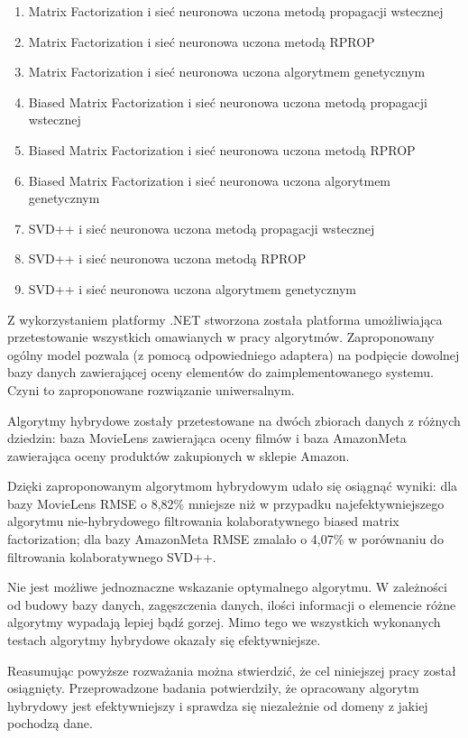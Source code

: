 \documentclass[twoside]{iisthesis}
\begin{document}
	\begin{enumerate}
		\item Matrix Factorization i sieć neuronowa uczona metodą propagacji wstecznej
		\item Matrix Factorization i sieć neuronowa uczona metodą RPROP
		\item Matrix Factorization i sieć neuronowa uczona algorytmem genetycznym
		\item Biased Matrix Factorization i sieć neuronowa uczona metodą propagacji wstecznej
		\item Biased Matrix Factorization i sieć neuronowa uczona metodą RPROP
		\item Biased Matrix Factorization i sieć neuronowa uczona algorytmem genetycznym
		\item SVD++ i sieć neuronowa uczona metodą propagacji wstecznej
		\item SVD++ i sieć neuronowa uczona metodą RPROP
		\item SVD++ i sieć neuronowa uczona algorytmem genetycznym
	\end{enumerate}
	
	Z wykorzystaniem platformy .NET stworzona została platforma umożliwiająca przetestowanie wszystkich omawianych w pracy algorytmów. Zaproponowany ogólny model pozwala (z pomocą odpowiedniego adaptera) na podpięcie dowolnej bazy danych zawierającej oceny elementów do zaimplementowanego systemu. Czyni to zaproponowane rozwiązanie uniwersalnym.
	
	Algorytmy hybrydowe zostały przetestowane na dwóch zbiorach danych z różnych dziedzin: baza MovieLens zawierająca oceny filmów i baza AmazonMeta zawierająca oceny produktów zakupionych w sklepie Amazon. 
	
	Dzięki zaproponowanym algorytmom hybrydowym udało się osiągnąć wyniki: dla bazy MovieLens RMSE o 8,82\% mniejsze niż w przypadku najefektywniejszego algorytmu nie-hybrydowego filtrowania kolaboratywnego biased matrix factorization; dla bazy AmazonMeta RMSE zmalało o 4,07\% w porównaniu do filtrowania kolaboratywnego SVD++. 
	
	Nie jest możliwe jednoznaczne wskazanie optymalnego algorytmu. W zależności od budowy bazy danych, zagęszczenia danych, ilości informacji o elemencie różne algorytmy wypadają lepiej bądź gorzej.  Mimo tego we wszystkich wykonanych testach algorytmy hybrydowe okazały się efektywniejsze.
	
	Reasumując powyższe rozważania można stwierdzić, że cel niniejszej pracy został osiągnięty. Przeprowadzone badania potwierdziły, że opracowany algorytm hybrydowy jest efektywniejszy i sprawdza się niezależnie od domeny z jakiej pochodzą dane. 

	



\clearpage




\end{document}
